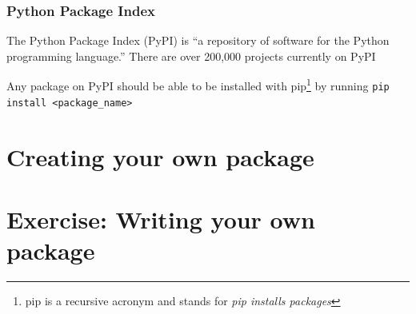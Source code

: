 \documentclass[10pt]{beamer}
\begin{document}
  \begin{frame} \frametitle{Python Package Index}

    The Python Package Index (PyPI) is ``a repository of software for the Python programming
    language.'' There are over 200,000 projects currently on PyPI

    \vspace{0.3cm}

    Any package on PyPI should be able to be installed with pip\footnote{pip is a recursive
    acronym and stands for \textit{pip installs packages}} by running
    \texttt{pip install <package\_name>}

  \end{frame}


\section{Creating your own package}

  \begin{frame} \frametitle{}
  \end{frame}


\section{Exercise: Writing your own package}
\end{document}

